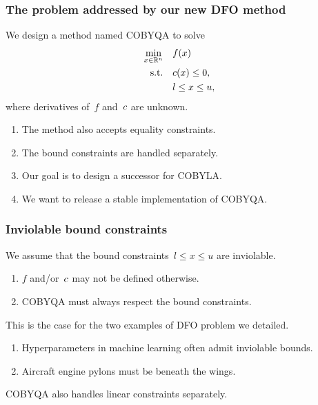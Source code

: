 \documentclass{polyu-presentation}
\newcommand{\con}[1][]{c\ifthenelse{\equal{#1}{}}{}{_{#1}}}
\newcommand{\obj}{f}
\newcommand{\xl}{l}
\newcommand{\xu}{u}
\begin{document}
\begin{frame}
    \frametitle{The problem addressed by our new DFO method}
    
	We design a method named \alert{COBYQA} to solve
    \begin{align*}
        \min_{x \in \R^n}   & \quad \obj(x)\\
        \text{s.t.}         & \quad \con(x) \le 0,\\
                            & \quad \xl \le x \le \xu,
    \end{align*}
    where derivatives of~$\obj$ and~$\con$ are \alert{unknown}.

    \medskip

    \begin{block}{}
        \begin{enumerate}
            \item The method also accepts equality constraints.
            \item The bound constraints are handled separately.
            \item Our goal is to design a \alert{successor} for COBYLA.
            \item We want to release a stable \alert{implementation} of COBYQA.
        \end{enumerate}
    \end{block}
\end{frame}

\begin{frame}
    \frametitle{Inviolable bound constraints}
    
	\begin{block}{}
        We assume that the bound constraints~$\xl \le x \le \xu$ are \alert{inviolable}.
        \begin{enumerate}
            \item $f$ and/or~$\con$ may \alert{not} be defined otherwise.
            \item COBYQA must \alert{always} respect the bound constraints.
        \end{enumerate}
    \end{block}

    \bigskip

    This is the case for the two examples of DFO problem we detailed.
    \begin{enumerate}
        \item Hyperparameters in machine learning often admit inviolable bounds.
        \item Aircraft engine pylons must be beneath the wings.
    \end{enumerate}

    \bigskip

    \begin{block}{}
        COBYQA also handles \alert{linear constraints} separately.
    \end{block}
\end{frame}
\end{document}
